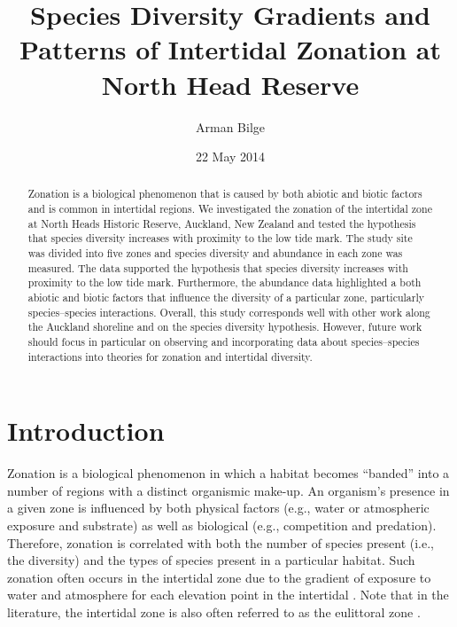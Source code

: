 \documentclass[11pt]{article}
\title{Species Diversity Gradients and Patterns of Intertidal Zonation at North Head Reserve}
\author{Arman Bilge}
\date{22 May 2014}
\begin{document}
	
	
	\setcounter{page}{1}
	
	\maketitle
	
	\onehalfspacing
	
	\begin{abstract}
		
		Zonation is a biological phenomenon that is caused by both abiotic and biotic factors and is common in intertidal regions. We investigated the zonation of the intertidal zone at North Heads Historic Reserve, Auckland, New Zealand and tested the hypothesis that species diversity increases with proximity to the low tide mark. The study site was divided into five zones and species diversity and abundance in each zone was measured. The data supported the hypothesis that species diversity increases with proximity to the low tide mark. Furthermore, the abundance data highlighted a both abiotic and biotic factors that influence the diversity of a particular zone, particularly species--species interactions. Overall, this study corresponds well with other work along the Auckland shoreline and on the species diversity hypothesis. However, future work should focus in particular on observing and incorporating data about species--species interactions into theories for zonation and intertidal diversity.
		
	\end{abstract}
	
	\section*{Introduction}
	
	Zonation is a biological phenomenon in which a habitat becomes \enquote{banded} into a number of regions with a distinct organismic make-up. An organism's presence in a given zone is influenced by both physical factors (e.g., water or atmospheric exposure and substrate) \parencite{Morton:2004} as well as biological (e.g., competition and predation). Therefore, zonation is correlated with both the number of species present (i.e., the diversity) and the types of species present in a particular habitat. Such zonation often occurs in the intertidal zone due to the gradient of exposure to water and atmosphere for each elevation point in the intertidal  \parencite{Dellow:1950,Morton:2004}. Note that in the literature, the intertidal zone is also often referred to as the eulittoral zone \parencite{Dellow:1950,Morton:2004}.
	
\end{document}
